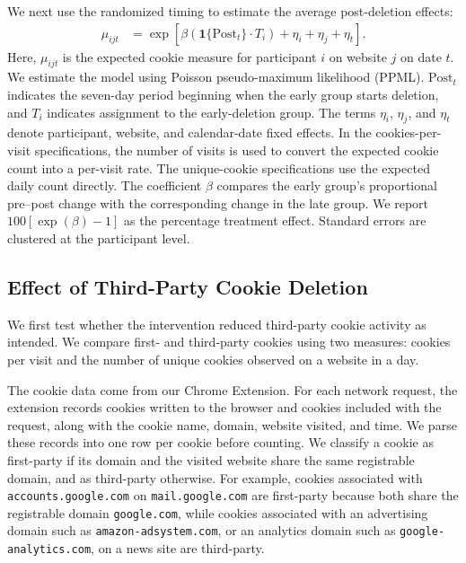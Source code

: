 \documentclass[12pt]{article}
\theoremstyle{definition}
\theoremstyle{remark}
\begin{document}
\begin{appendix}
We next use the randomized timing to estimate the average post-deletion effects:
\begin{equation}\label{eq:cookie_deletion_did}
\begin{aligned}
\mu_{ijt}
&=
\exp\left[
\beta\left(
\mathbf{1}\{\text{Post}_t\}\cdot T_i
\right)
+\eta_i+\eta_j+\eta_t
\right].
\end{aligned}
\end{equation}
Here, $\mu_{ijt}$ is the expected cookie measure for participant $i$ on website $j$ on date $t$. We estimate the model using Poisson pseudo-maximum likelihood (PPML). $\text{Post}_t$ indicates the seven-day period beginning when the early group starts deletion, and $T_i$ indicates assignment to the early-deletion group. The terms $\eta_i$, $\eta_j$, and $\eta_t$ denote participant, website, and calendar-date fixed effects. In the cookies-per-visit specifications, the number of visits is used to convert the expected cookie count into a per-visit rate. The unique-cookie specifications use the expected daily count directly. The coefficient $\beta$ compares the early group's proportional pre--post change with the corresponding change in the late group. We report $100[\exp(\beta)-1]$ as the percentage treatment effect. Standard errors are clustered at the participant level.

\subsection{Effect of Third-Party Cookie Deletion}\label{subsec:cookie_deletion_third_party_cookies_per_visit}

We first test whether the intervention reduced third-party cookie activity as intended. We compare first- and third-party cookies using two measures: cookies per visit and the number of unique cookies observed on a website in a day.

The cookie data come from our Chrome Extension. For each network request, the extension records cookies written to the browser and cookies included with the request, along with the cookie name, domain, website visited, and time. We parse these records into one row per cookie before counting. We classify a cookie as first-party if its domain and the visited website share the same registrable domain, and as third-party otherwise. For example, cookies associated with \texttt{accounts.google.com} on \texttt{mail.google.com} are first-party because both share the registrable domain \texttt{google.com}, while cookies associated with an advertising domain such as \texttt{amazon-adsystem.com}, or an analytics domain such as \texttt{google-analytics.com}, on a news site are third-party.


\end{appendix}
\end{document}
